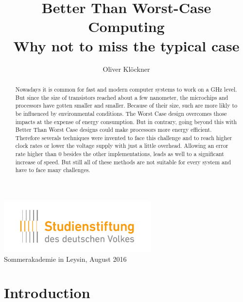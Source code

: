 \documentclass[12pt, a4paper]{article}
\begin{document}
	
	\title{%
		{\bfseries Better Than Worst-Case Computing }\\[1ex] %
		{\large\bfseries Why not to miss the typical case} %
	}
	\author{Oliver Klöckner} %
	
	\date{\vspace{-5ex}} %
	
	{\sf \maketitle} %
	
	\begin{center}
		\includegraphics[width=8cm]{logo_sdv.pdf}\\
		{\large\sf Sommerakademie in Leysin, August 2016}
	\end{center}
	
	\vspace{1cm}
	
	\begin{abstract}
	Nowadays it is common for fast and modern computer systems to work on a GHz level. But since the size of transistors reached about a few nanometer, the microchips and processors have gotten smaller and smaller. Because of their size, such are more likly to be influenced by environmental conditions. The Worst Case design overcomes those impacts at the expense of energy consumption. But in contrary, going beyond this with Better Than Worst Case designs could make processors more energy efficient. Therefore severals techniques were invented to face this challenge and to reach higher clock rates or lower the voltage supply with just a little overhead. Allowing an error rate higher than 0 besides the other implementations, leads as well to a significant increase of speed. But still all of these methods are not suitable for every system and have to face many challenges. 
	\end{abstract}
	
	\newpage
	\tableofcontents
	
	\newpage
	\section{Introduction}\label{sec:introduction}
	
\end{document}
